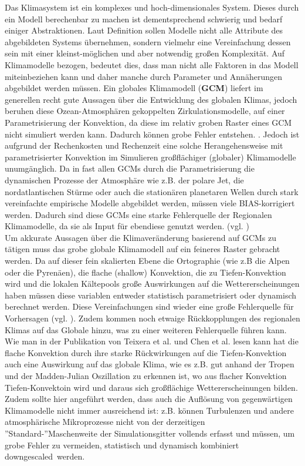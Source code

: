 Das Klimasystem ist ein komplexes und hoch-dimensionales System. Dieses durch ein Modell berechenbar zu machen ist dementsprechend schwierig und bedarf einiger Abstraktionen. Laut Definition \cite[vgl.][]{stachowiak} sollen Modelle nicht alle Attribute des abgebildeten Systems übernehmen, sondern vielmehr eine Vereinfachung dessen sein mit einer kleinst-möglichen und aber notwendig großen Komplexität. Auf Klimamodelle bezogen, bedeutet dies, dass man nicht alle Faktoren in das Modell miteinbeziehen kann und daher manche durch Parameter und Annäherungen abgebildet werden müssen. Ein globales Klimamodell (\textbf{GCM}) liefert im generellen recht gute Aussagen über die Entwicklung des globalen Klimas, jedoch beruhen diese Ozean-Atmosphären gekoppelten Zirkulationsmodelle, auf einer Parametrisierung der Konvektion, da diese im relativ groben Raster eines GCM nicht simuliert werden kann. Dadurch können grobe Fehler entstehen. \cite[vgl.][Stevens \& Bony]{stevensbony}. Jedoch ist aufgrund der Rechenkosten und Rechenzeit eine solche Herangehensweise mit parametrisierter Konvektion im Simulieren großflächiger (globaler) Klimamodelle  unumgänglich. Da in fast allen GCMs durch die Parametrisierung die dynamischen Prozesse der Atmosphäre wie z.B. der polare Jet, die nordatlantischen Stürme oder auch die stationären planetaren Wellen durch stark vereinfachte empirische Modelle abgebildet werden, müssen viele BIAS-korrigiert werden. Dadurch sind diese GCMs eine starke Fehlerquelle der Regionalen Klimamodelle, da sie als Input für ebendiese genutzt werden. (vgl. \cite{woollings_2013})\\
Um akkurate Aussagen über die Klimaveränderung basierend auf GCMs zu tätigen muss das grobe globale Klimamodell auf ein feineres Raster gebracht werden. Da auf dieser fein skalierten Ebene die Ortographie (wie z.B die Alpen oder die Pyrenäen), die flache (shallow) Konvektion, die zu Tiefen-Konvektion wird und die lokalen Kältepools große Auswirkungen auf die Wettererscheinungen haben müssen diese variablen entweder statistisch parametrisiert oder dynamisch berechnet werden. Diese Vereinfachungen sind wieder eine große Fehlerquelle für Vorhersagen (vgl. \cite{maraun_2010,casanueva_2013}). Zudem kommen noch etwaige Rückkopplungen des regionalen Klimas auf das Globale hinzu, was zu einer weiteren Fehlerquelle führen kann. Wie man in der Publikation von Teixera et al.\cite{teixeracardoso} und Chen et al.\cite{chenshuyi} lesen kann hat die flache Konvektion durch ihre starke Rückwirkungen auf die Tiefen-Konvektion auch eine Auswirkung auf das globale Klima, wie es z.B. gut anhand der Tropen und der Madden-Julian Oszillation zu erkennen ist, wo aus flacher Konvektion Tiefen-Konvektoin wird und daraus sich großflächige Wettererscheinungen bilden. Zudem sollte hier angeführt werden, dass auch die Auflösung von gegenwärtigen Klimamodelle nicht immer ausreichend ist: z.B. können Turbulenzen und andere atmosphärische Mikroprozesse nicht von der derzeitigen ''Standard-''Maschenweite der Simulationsgitter vollends erfasst und müssen, um grobe Fehler zu vermeiden, statistisch und dynamisch kombiniert \glqq downgescaled\grqq \ werden. \cite[vgl.][Maraun et al.]{marauntowards}\\
